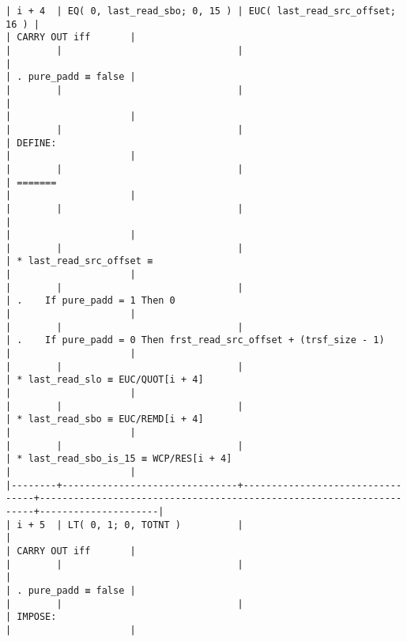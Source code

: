 \documentclass[varwidth=\maxdimen,margin=0.5cm,multi={verbatim}]{standalone}
\begin{document}
\begin{verbatim}
| i + 4  | EQ( 0, last_read_sbo; 0, 15 ) | EUC( last_read_src_offset; 16 ) |                                                                     | CARRY OUT iff       |
|        |                               |                                 |                                                                     | . pure_padd ≡ false |
|        |                               |                                 |                                                                     |                     |
|        |                               |                                 | DEFINE:                                                             |                     |
|        |                               |                                 | =======                                                             |                     |
|        |                               |                                 |                                                                     |                     |
|        |                               |                                 | * last_read_src_offset ≡                                            |                     |
|        |                               |                                 | .    If pure_padd = 1 Then 0                                        |                     |
|        |                               |                                 | .    If pure_padd = 0 Then frst_read_src_offset + (trsf_size - 1)   |                     |
|        |                               |                                 | * last_read_slo ≡ EUC/QUOT[i + 4]                                   |                     |
|        |                               |                                 | * last_read_sbo ≡ EUC/REMD[i + 4]                                   |                     |
|        |                               |                                 | * last_read_sbo_is_15 ≡ WCP/RES[i + 4]                              |                     |
|--------+-------------------------------+---------------------------------+---------------------------------------------------------------------+---------------------|
| i + 5  | LT( 0, 1; 0, TOTNT )          |                                 |                                                                     | CARRY OUT iff       |
|        |                               |                                 |                                                                     | . pure_padd ≡ false |
|        |                               |                                 | IMPOSE:                                                             |                     |

\end{verbatim}
\end{document}
